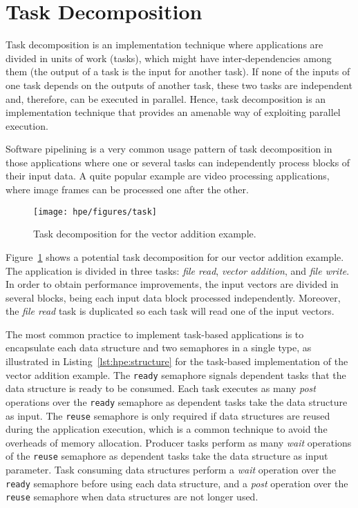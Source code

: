 \section{Task Decomposition}
Task decomposition is an implementation technique where applications are divided in units of work 
(\ie tasks), which might have inter\hyp{}dependencies among them (\ie the output of a task is the 
input for another task). If none of the inputs of one task depends on the outputs of another task, 
these two tasks are independent and, therefore, can be executed in parallel. Hence, task 
decomposition is an implementation technique that provides an amenable way of exploiting parallel 
execution.

Software pipelining is a very common usage pattern of task decomposition in those applications where 
one or several tasks can independently process blocks of their input data. A quite popular example 
are video processing applications, where image frames can be processed one after the other.

\begin{figure}
\centering
\texttt{[image: hpe/figures/task]}
\caption{Task decomposition for the vector addition example.}
\label{fig:hpe:task}
\end{figure}

Figure~\ref{fig:hpe:task} shows a potential task decomposition for our vector addition example. The 
application is divided in three tasks: \emph{file read}, \emph{vector addition}, and \emph{file 
write}. In order to obtain performance improvements, the input vectors are divided in several 
blocks, being each input data block processed independently. Moreover, the \emph{file read} task is 
duplicated so each task will read one of the input vectors.

The most common practice to implement task\hyp{}based applications is to encapsulate each data 
structure and two semaphores in a single type, as illustrated in Listing~\ref{lst:hpe:structure} for 
the task\hyp{}based implementation of the vector addition example. The \texttt{ready} semaphore 
signals dependent tasks that the data structure is ready to be consumed. Each task executes as many 
\emph{post} operations over the \texttt{ready} semaphore as dependent tasks take the data structure 
as input. The \texttt{reuse} semaphore is only required if data structures are reused during the 
application execution, which is a common technique to avoid the overheads of memory allocation.  
Producer tasks perform as many \emph{wait} operations of the \texttt{reuse} semaphore as dependent 
tasks take the data structure as input parameter. Task consuming data structures perform a 
\emph{wait} operation over the \texttt{ready} semaphore before using each data structure, and a 
\emph{post} operation over the \texttt{reuse} semaphore when data structures are not longer used.

